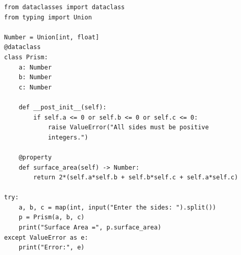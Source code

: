 \begin{verbatim}
from dataclasses import dataclass
from typing import Union

Number = Union[int, float]
@dataclass
class Prism:
    a: Number
    b: Number
    c: Number
    
    def __post_init__(self):
        if self.a <= 0 or self.b <= 0 or self.c <= 0:
            raise ValueError("All sides must be positive
            integers.")
    
    @property
    def surface_area(self) -> Number:
        return 2*(self.a*self.b + self.b*self.c + self.a*self.c)

try:
    a, b, c = map(int, input("Enter the sides: ").split())
    p = Prism(a, b, c)
    print("Surface Area =", p.surface_area)
except ValueError as e:
    print("Error:", e)
\end{verbatim}